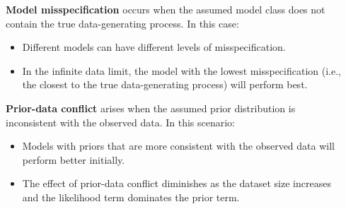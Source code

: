 \documentclass[25pt,a0paper,landscape]{tikzposter}
\begin{document}
\begin{columns}
{      %
    \begin{multicols}{2}
      \begin{theorybox}
        \textbf{Model misspecification} occurs when the assumed model class does not contain the true data-generating process. In this case:
        \begin{itemize}
          \item Different models can have different levels of misspecification.
          \item In the infinite data limit, the model with the lowest misspecification (i.e., the closest to the true data-generating process) will perform best.
        \end{itemize}
      \end{theorybox}
      \columnbreak
      \begin{theorybox}
        \textbf{Prior-data conflict} arises when the assumed prior distribution is inconsistent with the observed data. In this scenario:
        \begin{itemize}
        \item Models with priors that are more consistent with the observed data will perform better initially.
        \item The effect of prior-data conflict diminishes as the dataset size increases and the likelihood term dominates the prior term.
        \end{itemize}
      \end{theorybox}
    \end{multicols}
  }
  {
    }
\end{columns}
\end{document}
